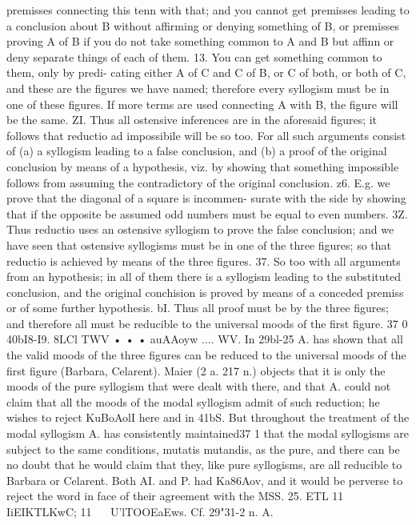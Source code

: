 {{{{{{{{{{premisses connecting this tenn with that; and you cannot get
premisses leading to a conclusion about B without affirming or
denying something of B, or premisses proving A of B if you do
not take something common to A and B but affinn or deny
separate things of each of them.
13. You can get something common to them, only by predi-
cating either A of C and C of B, or C of both, or both of C, and
these are the figures we have named; therefore every syllogism
must be in one of these figures. If more terms are used connecting
A with B, the figure will be the same.
ZI. Thus all ostensive inferences are in the aforesaid figures;
it follows that reductio ad impossibile will be so too. For all such
arguments consist of (a) a syllogism leading to a false conclusion,
and (b) a proof of the original conclusion by means of a hypothesis,
viz. by showing that something impossible follows from assuming
the contradictory of the original conclusion.
z6. E.g. we prove that the diagonal of a square is incommen-
surate with the side by showing that if the opposite be assumed
odd numbers must be equal to even numbers.
3Z. Thus reductio uses an ostensive syllogism to prove the false
conclusion; and we have seen that ostensive syllogisms must be
in one of the three figures; so that reductio is achieved by means of
the three figures.
37. So too with all arguments from an hypothesis; in all of
them there is a syllogism leading to the substituted conclusion,
and the original conchision is proved by means of a conceded
premiss or of some further hypothesis.
bI. Thus all proof must be by the three figures; and therefore
all must be reducible to the universal moods of the first figure.
37 0
40bI8-I9. 8LCl TWV • • • auAAoyw .... WV. In 29bl-25 A. has shown
that all the valid moods of the three figures can be reduced to the
universal moods of the first figure (Barbara, Celarent). Maier
(2 a. 217 n.) objects that it is only the moods of the pure syllogism
that were dealt with there, and that A. could not claim that all
the moods of the modal syllogism admit of such reduction; he
wishes to reject KuBoAolI here and in 41bS. But throughout the
treatment of the modal syllogism A. has consistently maintained37 1
that the modal syllogisms are subject to the same conditions,
mutatis mutandis, as the pure, and there can be no doubt that
he would claim that they, like pure syllogisms, are all reducible
to Barbara or Celarent. Both AI. and P. had Ka86Aov, and it
would be perverse to reject the word in face of their agreement
with the MSS.
25. ETL 11 IiEIKTLKwC; 11 ~~ U'lTOOEaEws. Cf. 29"31-2 n. A.
}}}}}}}}}}
